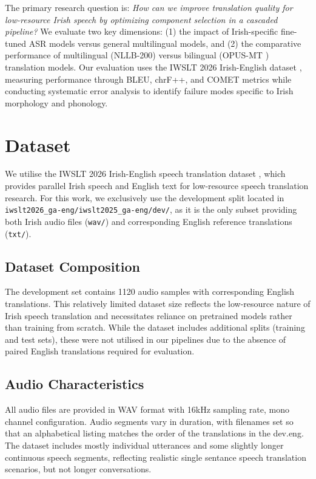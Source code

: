 \documentclass[11pt]{article}
\begin{document}
The primary research question is: \textit{How can we improve translation quality for low-resource Irish speech by optimizing component selection in a cascaded pipeline?}
We evaluate two key dimensions: (1) the impact of Irish-specific fine-tuned ASR models versus general multilingual models, and (2) the comparative performance of multilingual
(NLLB-200) versus bilingual (OPUS-MT \citep{opus-mt-ga-en}) translation models. Our evaluation uses the IWSLT 2026 Irish-English dataset \citep{iwslt2026dataset}, measuring performance through
BLEU, chrF++, and COMET metrics while conducting systematic error analysis to identify failure modes specific to Irish morphology and phonology.

\section{Dataset}

We utilise the IWSLT 2026 Irish-English speech translation dataset \citep{iwslt2026dataset}, which provides parallel Irish speech and English text for low-resource speech 
translation research. For this work, we exclusively use the development split located in \texttt{iwslt2026\_ga-eng/iwslt2025\_ga-eng/dev/}, as it is the only subset providing 
both Irish audio files (\texttt{wav/}) and corresponding English reference translations (\texttt{txt/}).

\subsection{Dataset Composition}

The development set contains 1120 audio samples with corresponding English translations. This relatively limited dataset size reflects the low-resource nature of Irish speech translation 
and necessitates reliance on pretrained models rather than training from scratch. While the dataset includes additional splits (training and test sets), these were not 
utilised in our pipelines due to the absence of paired English translations required for evaluation.

\subsection{Audio Characteristics}

All audio files are provided in WAV format with 16kHz sampling rate, mono channel configuration. Audio segments vary in duration, with filenames set so that an alphabetical listing
matches the order of the translations in the dev.eng. The dataset includes mostly individual utterances and some slightly longer continuous speech segments, reflecting realistic single 
sentance speech translation scenarios, but not longer conversations.
\end{document}
